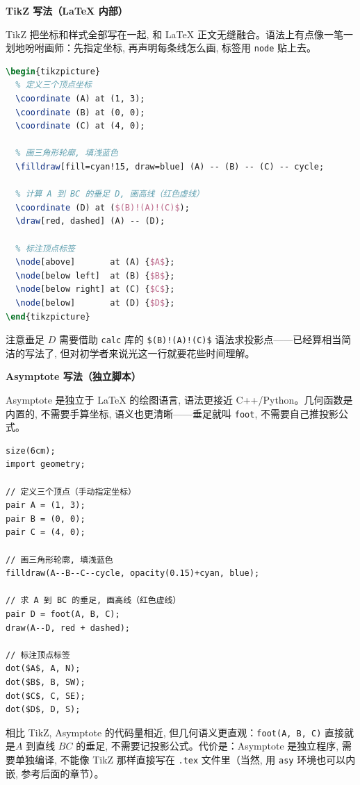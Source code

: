 \documentclass[11pt,oneside]{ctexbook}
\begin{document}
\medskip
\noindent\textbf{TikZ 写法（LaTeX 内部）}

TikZ 把坐标和样式全部写在一起, 和 LaTeX 正文无缝融合。语法上有点像一笔一划地吩咐画师：先指定坐标, 再声明每条线怎么画, 标签用 \texttt{node} 贴上去。

\begin{lstlisting}[language=tex]
\begin{tikzpicture}
  % 定义三个顶点坐标
  \coordinate (A) at (1, 3);
  \coordinate (B) at (0, 0);
  \coordinate (C) at (4, 0);

  % 画三角形轮廓, 填浅蓝色
  \filldraw[fill=cyan!15, draw=blue] (A) -- (B) -- (C) -- cycle;

  % 计算 A 到 BC 的垂足 D, 画高线（红色虚线）
  \coordinate (D) at ($(B)!(A)!(C)$);
  \draw[red, dashed] (A) -- (D);

  % 标注顶点标签
  \node[above]       at (A) {$A$};
  \node[below left]  at (B) {$B$};
  \node[below right] at (C) {$C$};
  \node[below]       at (D) {$D$};
\end{tikzpicture}
\end{lstlisting}

注意垂足 $D$ 需要借助 \texttt{calc} 库的 \texttt{\$(B)!(A)!(C)\$} 语法求投影点——已经算相当简洁的写法了, 但对初学者来说光这一行就要花些时间理解。

\medskip
\noindent\textbf{Asymptote 写法（独立脚本）}

Asymptote 是独立于 LaTeX 的绘图语言, 语法更接近 C++/Python。几何函数是内置的, 不需要手算坐标, 语义也更清晰——垂足就叫 \texttt{foot}, 不需要自己推投影公式。

\begin{lstlisting}[language={}]
size(6cm);
import geometry;

// 定义三个顶点（手动指定坐标）
pair A = (1, 3);
pair B = (0, 0);
pair C = (4, 0);

// 画三角形轮廓, 填浅蓝色
filldraw(A--B--C--cycle, opacity(0.15)+cyan, blue);

// 求 A 到 BC 的垂足, 画高线（红色虚线）
pair D = foot(A, B, C);
draw(A--D, red + dashed);

// 标注顶点标签
dot($A$, A, N);
dot($B$, B, SW);
dot($C$, C, SE);
dot($D$, D, S);
\end{lstlisting}

相比 TikZ, Asymptote 的代码量相近, 但几何语义更直观：\texttt{foot(A, B, C)} 直接就是$A$ 到直线 $BC$ 的垂足, 不需要记投影公式。代价是：Asymptote 是独立程序, 需要单独编译, 不能像 TikZ 那样直接写在 \texttt{.tex} 文件里（当然, 用 \texttt{asy} 环境也可以内嵌, 参考后面的章节）。
\end{document}
